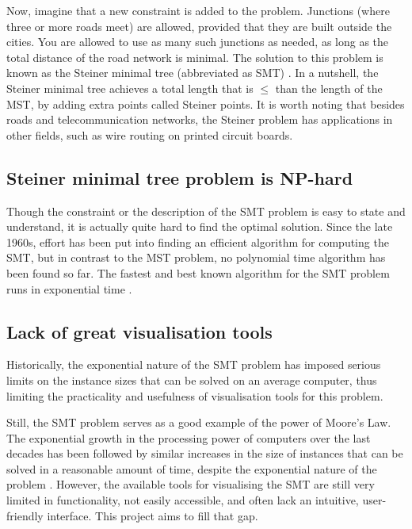 \documentclass{l4proj}
\begin{document}
Now, imagine that a new constraint is added to the problem. Junctions (where three or more roads meet) are allowed, provided that they are built outside the cities. You are allowed to use as many such junctions as needed, as long as the total distance of the road network is minimal. The solution to this problem is known as the Steiner minimal tree (abbreviated as SMT) \citep{MelzakAlgo}.
In a nutshell, the Steiner minimal tree achieves a total length that is $\leq$ than the length of the MST, by adding extra points called Steiner points.
It is worth noting that besides roads and telecommunication networks, the Steiner problem has applications in other fields, such as wire routing on printed circuit boards.

\subsection{Steiner minimal tree problem is NP-hard}
Though the constraint or the description of the SMT problem is easy to state and understand, it is actually quite hard to find the optimal solution.
Since the late 1960s, effort has been put into finding an efficient algorithm for computing the SMT, but in contrast to the MST problem, no polynomial time algorithm has been found so far. The fastest and best known algorithm for the SMT problem runs in exponential time \citep{geosteiner96}.

\subsection{Lack of great visualisation tools}
Historically, the exponential nature of the SMT problem has imposed serious limits on the instance sizes that can be solved on an average computer, thus limiting the practicality and usefulness of visualisation tools for this problem.

Still, the SMT problem serves as a good example of the power of Moore's Law. The exponential growth in the processing power of computers over the last decades has been followed by similar increases in the size of instances that can be solved in a reasonable amount of time, despite the exponential nature of the problem \citep{29ee725d11ac4584b72f7fe66c4326fa}.
However, the available tools for visualising the SMT are still very limited in functionality, not easily accessible, and often lack an intuitive, user-friendly interface.
This project aims to fill that gap.


\end{document}
